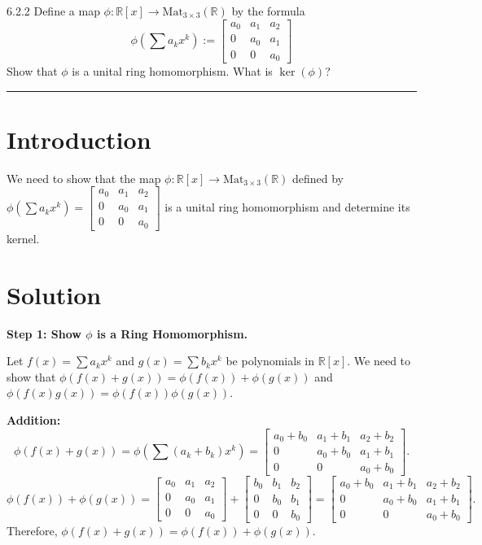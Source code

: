 \documentclass[12pt]{amsart}
\theoremstyle{definition}
\numberwithin{equation}{section}
\newcommand{\R}{\mathbb{R}}
\begin{document}
\newpage
\begin{exercise}{6.2.2} Define a map \(\phi: \R[x] \rightarrow \text{Mat}_{3\times 3}(\R)\) by the formula \[\phi(\sum a_k x^k):= \begin{bmatrix} a_0 & a_1 & a_2 \\ 0 & a_0 & a_1 \\ 0 & 0 & a_0 \end{bmatrix}\] Show that \(\phi \) is a unital ring homomorphism. What is \(\ker(\phi)\)?

    \noindent\rule{\linewidth}{1pt}

    \section*{Introduction}
    We need to show that the map \(\phi: \R[x] \rightarrow \text{Mat}_{3\times 3}(\R)\) defined by \(\phi(\sum a_k x^k) = \begin{bmatrix} a_0 & a_1 & a_2 \\ 0 & a_0 & a_1 \\ 0 & 0 & a_0 \end{bmatrix}\) is a unital ring homomorphism and determine its kernel.

    \section*{Solution}
    \noindent \textbf{Step 1: Show \(\phi \) is a Ring Homomorphism.}

    Let \(f(x) = \sum a_k x^k\) and \(g(x) = \sum b_k x^k\) be polynomials in \(\R[x]\). We need to show that \(\phi(f(x) + g(x)) = \phi(f(x)) + \phi(g(x))\) and \(\phi(f(x)g(x)) = \phi(f(x))\phi(g(x))\).

    \noindent \textbf{Addition:}
    \[
    \phi(f(x) + g(x)) = \phi\left(\sum (a_k + b_k) x^k\right) = \begin{bmatrix} a_0 + b_0 & a_1 + b_1 & a_2 + b_2 \\ 0 & a_0 + b_0 & a_1 + b_1 \\ 0 & 0 & a_0 + b_0 \end{bmatrix}.
    \]
    \[
    \phi(f(x)) + \phi(g(x)) = \begin{bmatrix} a_0 & a_1 & a_2 \\ 0 & a_0 & a_1 \\ 0 & 0 & a_0 \end{bmatrix} + \begin{bmatrix} b_0 & b_1 & b_2 \\ 0 & b_0 & b_1 \\ 0 & 0 & b_0 \end{bmatrix} = \begin{bmatrix} a_0 + b_0 & a_1 + b_1 & a_2 + b_2 \\ 0 & a_0 + b_0 & a_1 + b_1 \\ 0 & 0 & a_0 + b_0 \end{bmatrix}.
    \]
    Therefore, \(\phi(f(x) + g(x)) = \phi(f(x)) + \phi(g(x))\).


\end{exercise}
\end{document}
